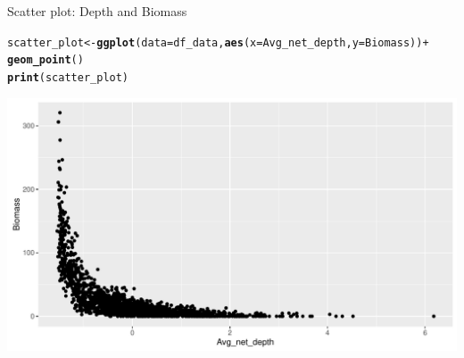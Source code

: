 \documentclass{beamer}\usepackage[]{graphicx}\usepackage[]{color}
\makeatletter
\newcommand{\hlopt}[1]{\textcolor[rgb]{0,0,0}{#1}}%
\newcommand{\hlstd}[1]{\textcolor[rgb]{0.345,0.345,0.345}{#1}}%
\newcommand{\hlkwb}[1]{\textcolor[rgb]{0.69,0.353,0.396}{#1}}%
\newcommand{\hlkwc}[1]{\textcolor[rgb]{0.333,0.667,0.333}{#1}}%
\newcommand{\hlkwd}[1]{\textcolor[rgb]{0.737,0.353,0.396}{\textbf{#1}}}%
\newenvironment{kframe}{%
 \def\at@end@of@kframe{}%
 \ifinner\ifhmode%
  \def\at@end@of@kframe{\end{minipage}}%
  \begin{minipage}{\columnwidth}%
 \fi\fi%
 \def\FrameCommand##1{\hskip\@totalleftmargin \hskip-\fboxsep
 \colorbox{shadecolor}{##1}\hskip-\fboxsep
     \hskip-\linewidth \hskip-\@totalleftmargin \hskip\columnwidth}%
 \MakeFramed {\advance\hsize-\width
   \@totalleftmargin\z@ \linewidth\hsize
   \@setminipage}}%
 {\par\unskip\endMakeFramed%
 \at@end@of@kframe}
\newenvironment{knitrout}{}{} %
\makeatother
\begin{document}
\begin{frame}[fragile]{Scatter plot: Depth and Biomass}
\begin{knitrout}\footnotesize
{}\color{fgcolor}\begin{kframe}
\begin{alltt}
  \hlstd{scatter_plot} \hlkwb{<-} \hlkwd{ggplot}\hlstd{(}\hlkwc{data}\hlstd{=df_data,} \hlkwd{aes}\hlstd{(}\hlkwc{x}\hlstd{=Avg_net_depth,} \hlkwc{y}\hlstd{=Biomass))} \hlopt{+}
                \hlkwd{geom_point}\hlstd{()}
  \hlkwd{print}\hlstd{(scatter_plot)}
\end{alltt}
\end{kframe}

{\centering \includegraphics[width=.9\linewidth]{figure/scatter_plot_base-1} 

}



\end{knitrout}
\end{frame}
\end{document}
